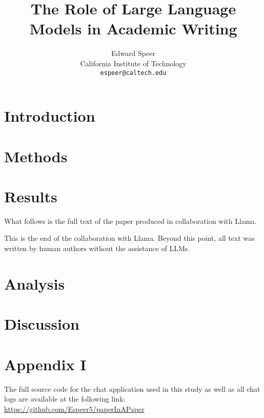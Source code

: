 \documentclass[11pt, a4paper, hyphens]{article}
\title{The Role of Large Language Models in Academic Writing}
\author{%
  Edward Speer
  \\
  California Institute of Technology\\
  \texttt{espeer@caltech.edu} \\
}
\date{\monthyeardate}
\begin{document}
\maketitle

\section{Introduction}\label{sec:introduction}



\section{Methods}\label{sec:methods}



\section{Results}\label{sec:results}

What follows is the full text of the paper produced in collaboration with Llama.


% 

This is the end of the collaboration with Llama. Beyond this point, all text
was written by human authors without the assistance of LLMs.

\section{Analysis}\label{sec:analysis}



\section{Discussion}\label{sec:conclusion}



\pagebreak

\section{Appendix I}\label{sec:appendixI}

The full source code for the chat application used in this study as well as all
chat logs are available at the following link: 
\url{https://github.com/Espeer5/paperInAPaper}


\end{document}
